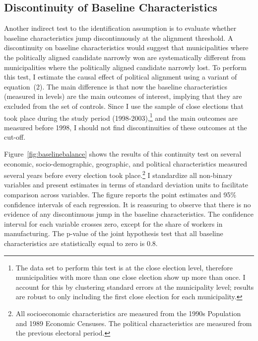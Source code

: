 \documentclass[dv_diss_main.tex]{subfiles}
\begin{document}

\subsection{Discontinuity of Baseline Characteristics} Another indirect test to the identification assumption is to evaluate whether baseline characteristics jump discontinuously at the alignment threshold. A discontinuity on baseline characteristics would suggest that municipalities where the politically aligned candidate narrowly won are systematically different from municipalities where the politically aligned candidate narrowly lost.
To perform this test, I estimate the causal effect of political alignment using a variant of equation~(2).  The main difference is that now the baseline characteristics (measured in levels) are the main outcomes of interest, implying that they are excluded from the set of controls. Since I use the sample of close elections that took place during the study period (1998-2003),\footnote{The data set to perform this test is at the close election level, therefore municipalities with more than one close election show up more than once. I account for this by clustering standard errors at the municipality level; results are robust to only including the first close election for each municipality.} and the main outcomes are measured before 1998, I should not find discontinuities of these outcomes at the cut-off.

Figure~\ref{fig:baselinebalance} shows the results of this continuity test on several economic, socio-demographic, geographic, and political characteristics measured several years before every election took place.\footnote{All socioeconomic characteristics are measured from the 1990s Population and 1989 Economic Censuses. The political characteristics are measured from the previous electoral period.} 
I standardize all non-binary variables and present estimates in terms of standard deviation units to facilitate comparison across variables. The figure reports the point estimates and 95\% confidence intervals of each regression.
It is reassuring to observe that there is no evidence of any discontinuous jump in the baseline characteristics. The confidence interval for each variable crosses zero, except for the share of workers in manufacturing. The p-value of the joint hypothesis test that all baseline characteristics are statistically equal to zero is 0.8. 
\end{document}
